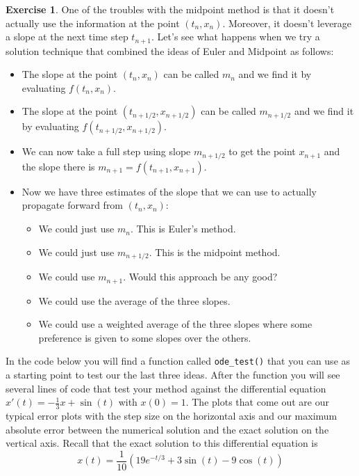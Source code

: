 \documentclass[
]{book}
\providecommand{\tightlist}{%
  \setlength{\itemsep}{0pt}\setlength{\parskip}{0pt}}
\theoremstyle{definition}
\theoremstyle{definition}
\theoremstyle{definition}
\newtheorem{exercise}{Exercise}[chapter]
\theoremstyle{remark}
\begin{document}
\begin{exercise}
\protect\hypertarget{exr:unnamed-chunk-450}{}{\label{exr:unnamed-chunk-450} }One of the troubles with the midpoint method is that it doesn't actually use the information at the point \((t_n,x_n)\). Moreover, it doesn't leverage a slope at the next time step \(t_{n+1}\). Let's see what happens when we try a solution technique that combined the ideas of Euler and Midpoint as follows:

\begin{itemize}
\tightlist
\item
  The slope at the point \((t_n,x_n)\) can be called \(m_n\) and we find it by evaluating \(f(t_n,x_n)\).
\item
  The slope at the point \((t_{n+1/2}, x_{n+1/2})\) can be called \(m_{n+1/2}\) and we find it by evaluating \(f(t_{n+1/2}, x_{n+1/2})\).
\item
  We can now take a full step using slope \(m_{n+1/2}\) to get the point \(x_{n+1}\) and the slope there is \(m_{n+1} = f(t_{n+1}, x_{n+1})\).
\item
  Now we have three estimates of the slope that we can use to actually propagate forward from \((t_n,x_n)\):

  \begin{itemize}
  \tightlist
  \item
    We could just use \(m_n\). This is Euler's method.
  \item
    We could just use \(m_{n+1/2}\). This is the midpoint method.
  \item
    We could use \(m_{n+1}\). Would this approach be any good?
  \item
    We could use the average of the three slopes.
  \item
    We could use a weighted average of the three slopes where some preference is given to some slopes over the others.
  \end{itemize}
\end{itemize}

In the code below you will find a function called \texttt{ode\_test()} that you can use as a starting point to test our the last three ideas. After the function you will see several lines of code that test your method against the differential equation \(x'(t) = -\frac{1}{3}x + \sin(t)\) with \(x(0) = 1\). The plots that come out are our typical error plots with the step size on the horizontal axis and our maximum absolute error between the numerical solution and the exact solution on the vertical axis. Recall that the exact solution to this differential equation is
\[ x(t) = \frac{1}{10} \left( 19 e^{-t/3} + 3\sin(t) - 9\cos(t) \right) \]
\end{exercise}
\end{document}
